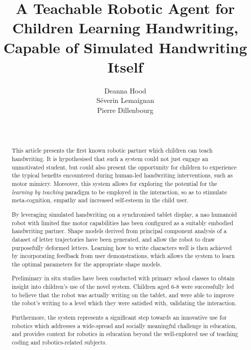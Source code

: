 \documentclass{sig-alternate}
\title{\LARGE \bf
A Teachable Robotic Agent for Children Learning Handwriting, Capable of Simulated Handwriting Itself %
}
\author{
\alignauthor
Deanna Hood\\
Séverin Lemaignan\\
Pierre Dillenbourg\\
   \affaddr{Computer-Human Interaction in Learning and Instruction Laboratory (CHILI)}\\
   \affaddr{École Polytechnique Fédérale\\ de Lausanne (EPFL)}\\
   \email{firstname.lastname@epfl.ch}
}
\begin{document}
\maketitle

\begin{abstract}




This article presents the first known robotic partner which children can teach handwriting. It is
hypothesised that such a system could not just engage an unmotivated student,
but could also present the opportunity for children to experience the typical
benefits encountered during human-led handwriting interventions, such as motor
mimicry. Moreover, this system allows for exploring the potential for the
\emph{learning by teaching} paradigm to be employed in the interaction, so as to
stimulate meta-cognition, empathy and increased self-esteem in the child user. 

By leveraging simulated handwriting on a synchronised tablet display, a {\sc nao}
humanoid robot with limited fine motor capabilities has been configured as a
suitably embodied handwriting partner. Shape models derived from principal
component analysis of a dataset of letter trajectories have been generated, and allow
the robot to draw purposefully deformed letters. Learning how to write
characters well is then achieved by incorporating feedback from user
demonstrations, which allows the system to learn the optimal parameters for the
appropriate shape models. 

Preliminary in situ studies have been conducted with primary school classes to obtain
insight into children's use of the novel system. 
Children aged 6-8 were successfully led to believe that the robot was
actually writing on the tablet, and were able to improve the robot's writing to a
level which they were satisfied with, validating the interaction. 

Furthermore, the system represents a
significant step towards an innovative use for robotics which addresses a
wide-spread and socially meaningful challenge in education, and provides context
for robotics in education beyond the well-explored use of teaching coding and
robotics-related subjects.

\end{abstract}
\end{document}
